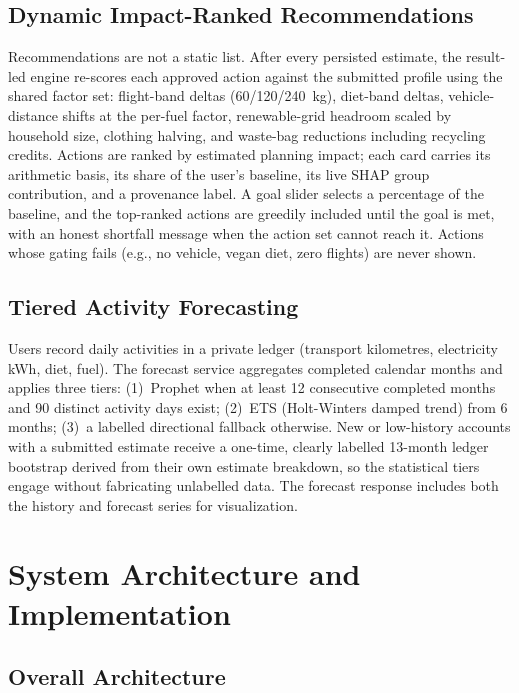 \documentclass[conference]{IEEEtran}
\begin{document}
\subsection{Dynamic Impact-Ranked Recommendations}

Recommendations are not a static list. After every persisted estimate, the result-led engine re-scores each approved action against the submitted profile using the shared factor set: flight-band deltas (60/120/240~kg), diet-band deltas, vehicle-distance shifts at the per-fuel factor, renewable-grid headroom scaled by household size, clothing halving, and waste-bag reductions including recycling credits. Actions are ranked by estimated planning impact; each card carries its arithmetic basis, its share of the user's baseline, its live SHAP group contribution, and a provenance label. A goal slider selects a percentage of the baseline, and the top-ranked actions are greedily included until the goal is met, with an honest shortfall message when the action set cannot reach it. Actions whose gating fails (e.g., no vehicle, vegan diet, zero flights) are never shown.

\subsection{Tiered Activity Forecasting}

Users record daily activities in a private ledger (transport kilometres, electricity kWh, diet, fuel). The forecast service aggregates completed calendar months and applies three tiers: (1)~Prophet when at least 12 consecutive completed months and 90 distinct activity days exist; (2)~ETS (Holt-Winters damped trend) from 6 months; (3)~a labelled directional fallback otherwise. New or low-history accounts with a submitted estimate receive a one-time, clearly labelled 13-month ledger bootstrap derived from their own estimate breakdown, so the statistical tiers engage without fabricating unlabelled data. The forecast response includes both the history and forecast series for visualization.

\FloatBarrier

\section{System Architecture and Implementation}

\subsection{Overall Architecture}
\end{document}
